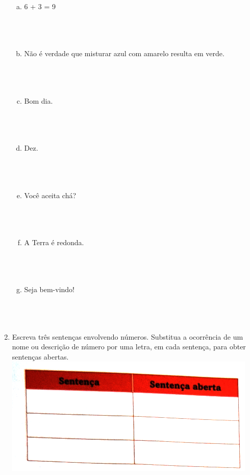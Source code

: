 \documentclass[a4paper,14pt]{article}
\begin{document}
\begin{multicols}{2}
\begin{enumerate}
\begin{enumerate}[a)]
    			\item 6 + 3 = 9 \\\\\\\\
    			\item Não é verdade que misturar azul com amarelo resulta em verde. \\\\\\\\
    			\item Bom dia. \\\\\\\\
    			\item Dez. \\\\\\\\
    			\item Você aceita chá? \\\\\\\\
    			\item A Terra é redonda. \\\\\\\\
    			\item Seja bem-vindo! \\\\\\\\
    		\end{enumerate}
    	    \item Escreva três sentenças envolvendo números. Substitua a ocorrência de um nome ou descrição de número por uma letra, em cada sentença, para obter sentenças abertas.
    	    \includegraphics[width=1\linewidth]{imagens_6MFA31/tabela2}

\end{enumerate}
\end{multicols}
\end{document}
